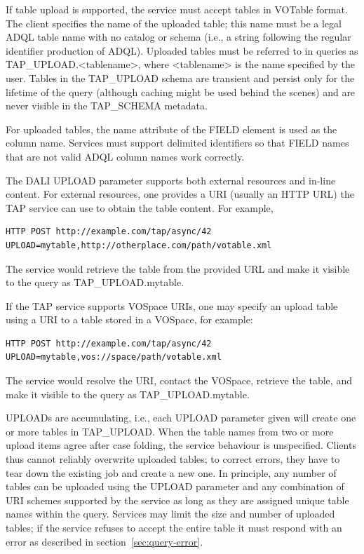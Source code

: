 \documentclass[11pt,letter]{ivoa}
\newcommand{\tapschema}{TAP\_SCHEMA}
\newcommand{\tapupload}{TAP\_UPLOAD}
\newcommand{\tapschema}{{%
  \relsize{-0.5}TAP\discretionary{-}{}{\kern-2pt\_}SCHEMA}}
\newcommand{\tapupload}{%
  {\relsize{-0.5}TAP\discretionary{-}{}{\kern-2pt\_}UPLOAD}}
\begin{document}
If table upload is supported, the service must accept tables in VOTable format. 
The client specifies the name of the uploaded table; this name must be a legal 
ADQL table name with no catalog or schema (i.e., a string following the 
regular identifier production of ADQL). Uploaded tables must be 
referred 
to in queries as \tapupload.<tablename>, where <tablename> is the name
specified by the user. Tables in the \tapupload{} schema are 
transient and persist only for the lifetime of the query (although caching might 
be used behind the scenes) and are never visible in the 
\tapschema{} metadata.

For uploaded tables, the name attribute of the FIELD element is used as the column 
name. Services must support delimited identifiers so that 
FIELD names that are not valid ADQL column names work correctly.

The DALI UPLOAD parameter supports both external resources and 
in-line 
content. For external resources, one provides a URI (usually an HTTP URL) the 
TAP service can use to obtain the table content. For example,
\begin{verbatim}
HTTP POST http://example.com/tap/async/42
UPLOAD=mytable,http://otherplace.com/path/votable.xml
\end{verbatim}
The service would retrieve the table from the provided URL and 
make it visible to the query as \tapupload.mytable.

If the TAP service supports VOSpace URIs, one may 
specify an upload table using a URI to a table stored in a VOSpace, for example:
\begin{verbatim}
HTTP POST http://example.com/tap/async/42
UPLOAD=mytable,vos://space/path/votable.xml
\end{verbatim}
The service would resolve the URI, contact the VOSpace, retrieve the table, and 
make it visible to the query as \tapupload.mytable.

UPLOADs are accumulating, i.e., each UPLOAD parameter given will create one or 
more tables in \tapupload. When the table names from two or more 
upload items agree after case folding, the service behaviour is unspecified. 
Clients thus cannot reliably overwrite uploaded tables; to correct errors, they 
have to tear down the existing job and create a new one. In principle, any 
number of tables can be uploaded using the UPLOAD parameter and any combination 
of URI schemes supported by the service as long as they are assigned unique 
table names within the query. Services may limit the size and number of 
uploaded tables; if the service refuses to accept the entire table it must 
respond with an error as described in section~\ref{sec:query-error}.
\end{document}

